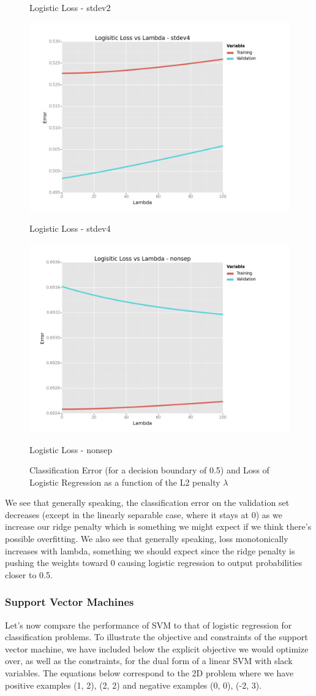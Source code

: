 \documentclass[10pt]{article}
\begin{document}
\begin{figure}[ht]
\begin{minipage}[b]{.24\linewidth}
		\caption*{Logistic Loss - stdev2}
	\end{minipage}
	\begin{minipage}[b]{.24\linewidth}
		\centering
		\includegraphics[width=.5\linewidth, height=.5in]{Loss_lambda_stdev4.png}
		\caption*{Logistic Loss - stdev4}
	\end{minipage}
	\begin{minipage}[b]{.24\linewidth}
		\centering
		\includegraphics[width=.5\linewidth, height=.5in]{Loss_lambda_nonsep.png}
		\caption*{Logistic Loss - nonsep}
	\end{minipage}
	\caption{Classification Error (for a decision boundary of 0.5) and Loss of Logistic Regression as a function of the L2 penalty $\lambda$}
\end{figure}

We see that generally speaking, the classification error on the validation set decreases (except in the linearly separable case, where it stays at 0) as we increase our ridge penalty which is something we might expect if we think there's possible overfitting. We also see that generally speaking, loss monotonically increases with lambda, something we should expect since the ridge penalty is pushing the weights toward 0 causing logistic regression to output probabilities closer to 0.5.

\subsubsection*{Support Vector Machines}

Let's now compare the performance of SVM to that of logistic regression for classification problems. To illustrate the objective and constraints of the support vector machine, we have included below the explicit objective we would optimize over, as well as the constraints, for the dual form of a linear SVM with slack variables. The equations below correspond to the 2D problem where we have positive examples (1, 2), (2, 2) and negative examples (0, 0), (-2, 3).
\end{document}
